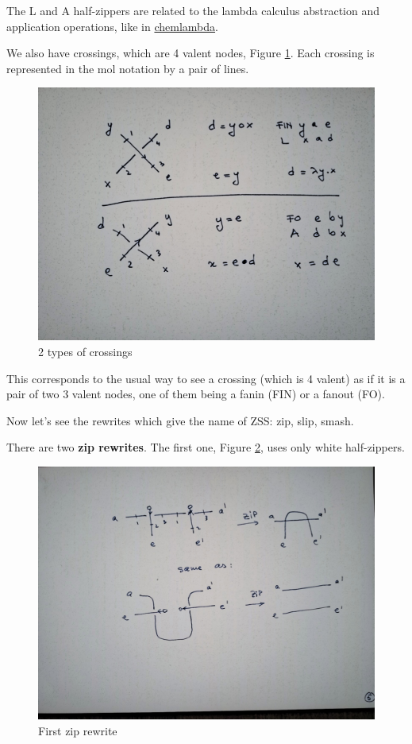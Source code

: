 \documentclass[]{article}
\begin{document}
The L and A half-zippers are related to the lambda calculus abstraction
and application operations, like in \cite{chemlambda} 
\href{https://mbuliga.github.io/quinegraphs/history-of-chemlambda.html\#ChemlambdaV2}{chemlambda}.

We also have crossings, which are 4 valent nodes, Figure \ref{2-types-of-crossings}. Each crossing is
represented in the mol notation by a pair of lines.

\begin{figure}[h!]
\centering
\includegraphics[width=0.75\linewidth]{img/3716.jpg}
\caption{2 types of crossings}
\label{2-types-of-crossings}
\end{figure}

This corresponds to the usual way to see a crossing (which is 4 valent)
as if it is a pair of two 3 valent nodes, one of them being a fanin
(FIN) or a fanout (FO).

Now let's see the rewrites which give the name of ZSS: zip, slip, smash.

There are two \textbf{zip rewrites}. The first one, Figure \ref{First-zip-rewrite}, uses only white
half-zippers.

\begin{figure}[h!]
\centering
\includegraphics[width=0.75\linewidth]{img/3748.jpg}
\caption{First zip rewrite}
\label{First-zip-rewrite}
\end{figure}
\end{document}
